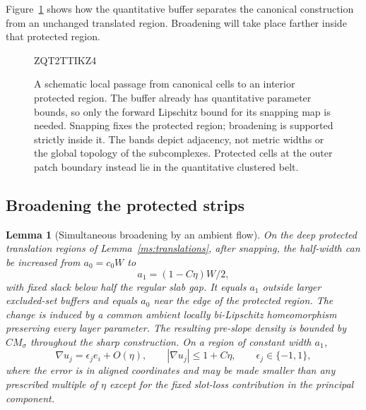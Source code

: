 \documentclass[11pt]{article}
\numberwithin{equation}{section}
\newtheorem{lemma}[theorem]{Lemma}
\theoremstyle{definition}
\theoremstyle{remark}
\begin{document}
Figure~\ref{ms:fig-protected-buffers} shows how the quantitative buffer
separates the canonical construction from an unchanged translated
region.  Broadening will take place farther inside that protected
region.

\begin{figure}[htbp]

ZQT2TTIKZ4
\caption{A schematic local passage from canonical cells to an interior
protected region.  The buffer already has quantitative parameter bounds,
so only the forward Lipschitz bound for its snapping map is needed.
Snapping fixes the protected region; broadening is supported strictly
inside it.  The bands depict adjacency, not metric widths or the global
topology of the subcomplexes.  Protected cells at the outer patch boundary
instead lie in the quantitative clustered belt.}
\label{ms:fig-protected-buffers}
\end{figure}

\subsection{Broadening the protected strips}

\begin{lemma}[Simultaneous broadening by an ambient flow]
\label{ms:broadening}
On the deep protected translation regions of
Lemma~\ref{ms:translations}, after snapping, the half-width can be
increased from $a_0=c_0W$ to
\begin{equation}
 a_1=(1-C\eta)W/2,
 \label{ms:wide-halfwidth}
\end{equation}
with fixed slack below half the regular slab gap.  It equals $a_1$
outside larger excluded-set buffers and equals $a_0$ near the edge
of the protected region.  The change is induced by a common
ambient locally bi-Lipschitz homeomorphism preserving every layer
parameter.  The resulting pre-slope density is bounded by
$CM_\sigma$ throughout the sharp construction.  On a region of
constant width $a_1$,
\begin{equation}
 \nabla u_j=\epsilon_j e_i+O(\eta),\qquad
 |\nabla u_j|\le1+C\eta,
 \qquad \epsilon_j\in\{-1,1\},
 \label{ms:sharp-scalar}
\end{equation}
where the error is in aligned coordinates and may be made smaller
than any prescribed multiple of $\eta$ except for the fixed
slot-loss contribution in the principal component.
\end{lemma}
\end{document}
